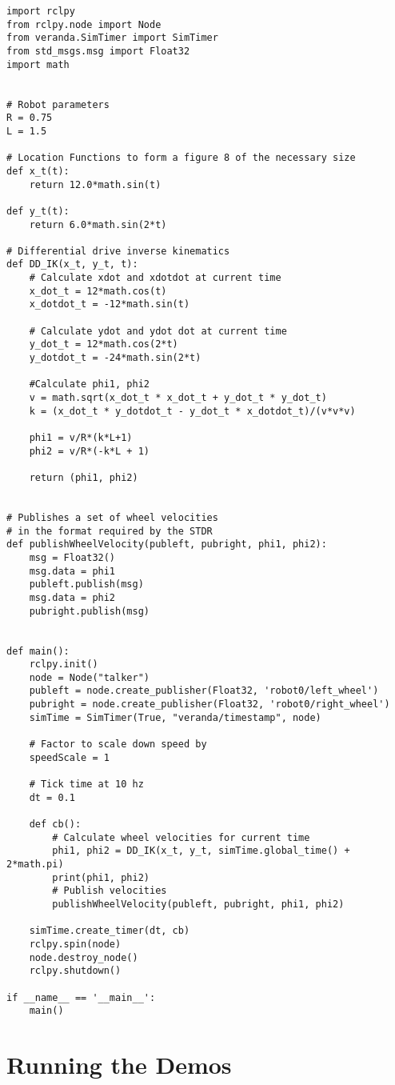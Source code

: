 \begin{verbatim}
import rclpy
from rclpy.node import Node
from veranda.SimTimer import SimTimer
from std_msgs.msg import Float32
import math


# Robot parameters
R = 0.75
L = 1.5

# Location Functions to form a figure 8 of the necessary size
def x_t(t):
    return 12.0*math.sin(t)

def y_t(t):
    return 6.0*math.sin(2*t)

# Differential drive inverse kinematics
def DD_IK(x_t, y_t, t):
    # Calculate xdot and xdotdot at current time
    x_dot_t = 12*math.cos(t)
    x_dotdot_t = -12*math.sin(t)

    # Calculate ydot and ydot dot at current time
    y_dot_t = 12*math.cos(2*t)
    y_dotdot_t = -24*math.sin(2*t)

    #Calculate phi1, phi2
    v = math.sqrt(x_dot_t * x_dot_t + y_dot_t * y_dot_t)
    k = (x_dot_t * y_dotdot_t - y_dot_t * x_dotdot_t)/(v*v*v)

    phi1 = v/R*(k*L+1)
    phi2 = v/R*(-k*L + 1)

    return (phi1, phi2)


# Publishes a set of wheel velocities
# in the format required by the STDR
def publishWheelVelocity(publeft, pubright, phi1, phi2):
    msg = Float32()
    msg.data = phi1
    publeft.publish(msg)
    msg.data = phi2
    pubright.publish(msg)


def main():
    rclpy.init()
    node = Node("talker")
    publeft = node.create_publisher(Float32, 'robot0/left_wheel')
    pubright = node.create_publisher(Float32, 'robot0/right_wheel')
    simTime = SimTimer(True, "veranda/timestamp", node)

    # Factor to scale down speed by
    speedScale = 1

    # Tick time at 10 hz
    dt = 0.1

    def cb():
        # Calculate wheel velocities for current time
        phi1, phi2 = DD_IK(x_t, y_t, simTime.global_time() + 2*math.pi)
        print(phi1, phi2)
        # Publish velocities
        publishWheelVelocity(publeft, pubright, phi1, phi2)

    simTime.create_timer(dt, cb)
    rclpy.spin(node)
    node.destroy_node()
    rclpy.shutdown()

if __name__ == '__main__':
    main()
\end{verbatim}

\hypertarget{running-the-demos}{%
\section{Running the Demos}\label{running-the-demos}}

